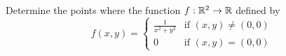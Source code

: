 \begin{problem}
  Determine the points where the function $f : \mathbb{R}^2 \to \mathbb{R}$ defined by
  \[
    f(x, y) = \begin{cases}
      \frac{1}{x^2 + y^2} & \text{if } (x, y) \neq (0, 0) \\
      0 & \text{if } (x, y) = (0, 0)
    \end{cases}
  \]
\end{problem}

\begin{answer}

\end{answer}
